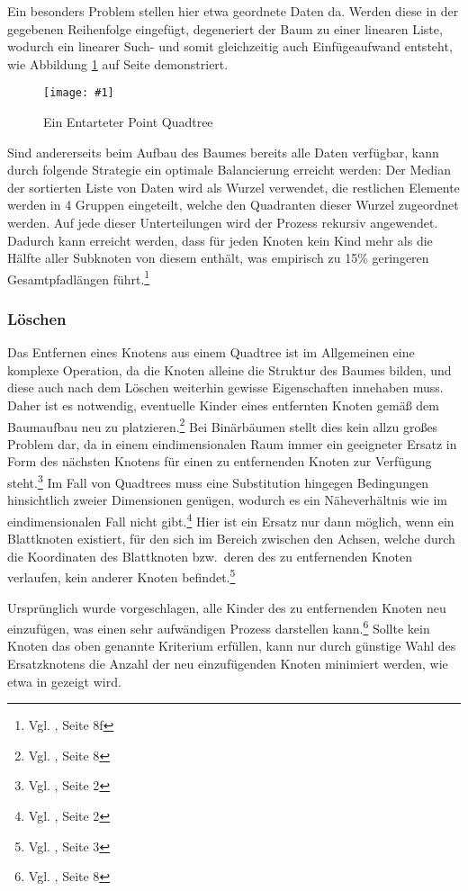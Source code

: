 \documentclass[%
			paper=a4,%
			DIV12,
			liststotoc,
			bibtotoc,
			draft=false,%
			titlepage
			]{scrartcl}
\newcommand{\zit}[3]{#1 \cite{#2}, #3}
\newcommand{\footzit}[3]{\footnote{\zit{#1}{#2}{#3}}}
\newcommand{\myfig}[5] {
 \begin{figure}[tbph]
	 \centering
	 \texttt{[image: \#1]}
	 \caption[#4]{#5}
	 \label{fig:#2}
 \end{figure}
}
\begin{document}
Ein besonders Problem stellen hier etwa geordnete Daten da. Werden diese in der gegebenen Reihenfolge eingefügt, degeneriert der Baum zu einer linearen Liste, wodurch ein linearer Such- und somit gleichzeitig auch Einfügeaufwand entsteht, wie Abbildung \ref{fig:entartung} auf Seite \pageref{fig:entartung} demonstriert.
\myfig{img/pointquadtree-entartet-trimmed}{entartung}{width=.6\textwidth}{Entarteter Point Quadtree}{Ein Entarteter Point Quadtree}

Sind andererseits beim Aufbau des Baumes bereits alle Daten verfügbar, kann durch folgende Strategie ein optimale Balancierung erreicht werden: Der Median der sortierten Liste von Daten wird als Wurzel verwendet, die restlichen Elemente werden in 4 Gruppen eingeteilt, welche den Quadranten dieser Wurzel zugeordnet werden.
Auf jede dieser Unterteilungen wird der Prozess rekursiv angewendet. Dadurch kann erreicht werden, dass für jeden Knoten kein Kind mehr als die Hälfte aller Subknoten von diesem enthält, was empirisch zu 15\% geringeren Gesamtpfadlängen führt.\footzit{Vgl.}{DBLP:journals/acta/FinkelB74}{Seite 8f}


\subsubsection{Löschen}
\label{sec:pointquadtree:delete}
Das Entfernen eines Knotens aus einem Quadtree ist im Allgemeinen eine komplexe Operation, da die Knoten alleine die Struktur des Baumes bilden, und diese auch nach dem Löschen weiterhin gewisse Eigenschaften innehaben muss.
Daher ist es notwendig, eventuelle Kinder eines entfernten Knoten gemäß dem Baumaufbau neu zu platzieren.\footzit{Vgl.}{DBLP:journals/acta/FinkelB74}{Seite 8}
Bei Binärbäumen stellt dies kein allzu großes Problem dar, da in einem eindimensionalen Raum immer ein geeigneter Ersatz in Form des nächsten Knotens für einen zu entfernenden Knoten zur Verfügung steht.\footzit{Vgl.}{DBLP:journals/cacm/Samet80a}{Seite 2}
Im Fall von Quadtrees muss eine Substitution hingegen Bedingungen hinsichtlich zweier Dimensionen genügen, wodurch es ein Näheverhältnis wie im eindimensionalen Fall nicht gibt.\footzit{Vgl.}{DBLP:journals/cacm/Samet80a}{Seite 2}
Hier ist ein Ersatz nur dann möglich, wenn ein Blattknoten existiert, für den sich im Bereich zwischen den Achsen, welche durch die Koordinaten des Blattknoten bzw.\ deren des zu entfernenden Knoten verlaufen, kein anderer Knoten befindet.\footzit{Vgl.}{DBLP:journals/cacm/Samet80a}{Seite 3}

Ursprünglich wurde vorgeschlagen, alle Kinder des zu entfernenden Knoten neu einzufügen, was einen sehr aufwändigen Prozess darstellen kann.\footzit{Vgl.}{DBLP:journals/acta/FinkelB74}{Seite 8}
Sollte kein Knoten das oben genannte Kriterium erfüllen, kann nur durch günstige Wahl des Ersatzknotens die Anzahl der neu einzufügenden Knoten minimiert werden, wie etwa in \cite{DBLP:journals/cacm/Samet80a} gezeigt wird.
\end{document}
